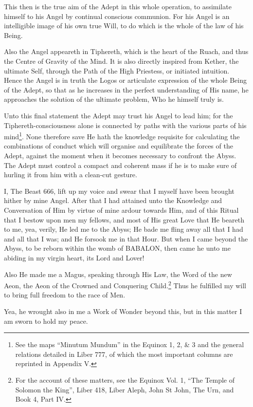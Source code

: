 This then is the true aim of the Adept in this whole operation, to assimilate himself to his Angel by continual conscious communion. For his Angel is an intelligible image of his own true Will, to do which is the whole of the law of his Being.

Also the Angel appeareth in Tiphereth, which is the heart of the Ruach, and thus the Centre of Gravity of the Mind. It is also directly inspired from Kether, the ultimate Self, through the Path of the High Priestess, or initiated intuition. Hence the Angel is in truth the Logos or articulate expression of the whole Being of the Adept, so that as he increases in the perfect understanding of His name, he approaches the solution of the ultimate problem, Who he himself truly is.

Unto this final statement the Adept may trust his Angel to lead him; for the Tiphereth-consciousness alone is connected by paths with the various parts of his mind\footnote{See the maps \enquote{Minutum Mundum} in the Equinox 1, 2, \& 3 and the general relations detailed in Liber 777, of which the most important columns are reprinted in Appendix V.}. None therefore save He hath the knowledge requisite for calculating the combinations of conduct which will organise and equilibrate the forces of the Adept, against the moment when it becomes necessary to confront the Abyss. The Adept must control a compact and coherent mass if he is to make sure of hurling it from him with a clean-cut gesture.

I, The Beast 666, lift up my voice and swear that I myself have been brought hither by mine Angel. After that I had attained unto the Knowledge and Conversation of Him by virtue of mine ardour towards Him, and of this Ritual that I bestow upon men my fellows, and most of His great Love that He beareth to me, yea, verily, He led me to the Abyss; He bade me fling away all that I had and all that I was; and He forsook me in that Hour. But when I came beyond the Abyss, to be reborn within the womb of BABALON, then came he unto me abiding in my virgin heart, its Lord and Lover!

Also He made me a Magus, speaking through His Law, the Word of the new Aeon, the Aeon of the Crowned and Conquering Child.\footnote{For the account of these matters, see the Equinox Vol. 1, \enquote{The Temple of Solomon the King}, Liber 418, Liber Aleph, John St John, The Urn, and Book 4, Part IV.} Thus he fulfilled my will to bring full freedom to the race of Men.

Yea, he wrought also in me a Work of Wonder beyond this, but in this matter I am sworn to hold my peace.
